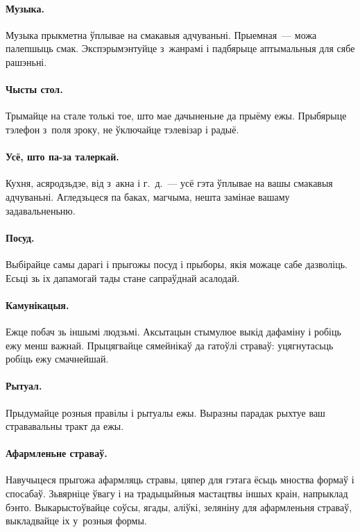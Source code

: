 \paragraph{Музыка.}
Музыка прыкметна ўплывае на смакавыя адчуваньні. Прыемная~--- можа палепшыць смак. Экспэрымэнтуйце з~жанрамі і падбярыце аптымальныя для сябе рашэньні.

\paragraph{Чысты стол.}
Трымайце на стале толькі тое, што мае дачыненьне да прыёму ежы. Прыбярыце тэлефон з~поля зроку, не ўключайце тэлевізар і радыё.

\paragraph{Усё, што па-за талеркай.}
Кухня, асяродзьдзе, від з~акна і г.~д.~--- усё гэта ўплывае на вашы смакавыя адчуваньні. Агледзьцеся па баках, магчыма, нешта замінае вашаму задавальненьню.

\paragraph{Посуд.}
Выбірайце самы дарагі і прыгожы посуд і прыборы, якія можаце сабе дазволіць. Есьці зь іх дапамогай тады стане сапраўднай асалодай.

\paragraph{Камунікацыя.}
Ежце побач зь іншымі людзьмі. Аксытацын стымулюе выкід дафаміну і робіць ежу менш важнай. Прыцягвайце сямейнікаў да гатоўлі страваў: уцягнутасьць робіць ежу смачнейшай.

\paragraph{Рытуал.}
Прыдумайце розныя правілы і рытуалы ежы. Выразны парадак рыхтуе ваш стрававальны тракт да ежы.

\paragraph{Афармленьне страваў.}
Навучыцеся прыгожа афармляць стравы, цяпер для гэтага ёсьць мноства формаў і спосабаў. Зьвярніце ўвагу і на традыцыйныя мастацтвы іншых краін, напрыклад бэнто. Выкарыстоўвайце соўсы, ягады, аліўкі, зеляніну для афармленьня страваў, выкладвайце іх у~розныя формы.

